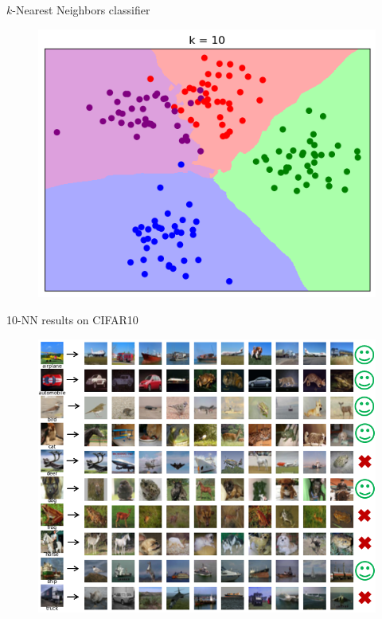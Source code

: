 \documentclass[dvipsnames]{beamer}
\begin{document}
\begin{frame}{$k$-Nearest Neighbors classifier}
\begin{figure}
\includegraphics[scale=.33]{figures/k_nn_boundary_k10.png}
\end{figure}
\end{frame}

\begin{frame}{10-NN results on CIFAR10}
\begin{figure}
\includegraphics[scale=.45]{figures/10nn_cifar.png}
\end{figure}
\end{frame}
\end{document}
